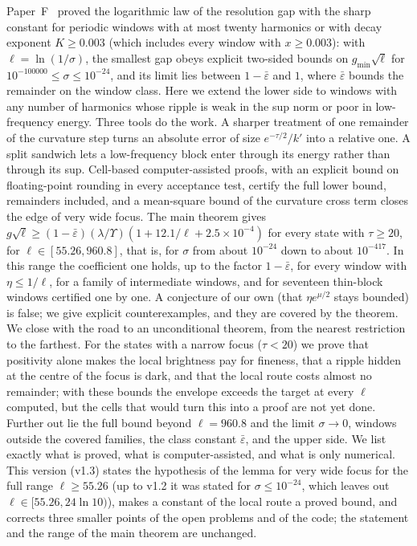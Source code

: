 Paper~F~\cite{F} proved the logarithmic law of the resolution gap with the sharp constant for periodic windows with at most twenty harmonics or with decay exponent $K\ge0.003$ (which includes every window with $x\ge0.003$):
with $\ell=\ln(1/\sigma)$, the smallest gap obeys explicit two-sided bounds on $g_{\min}\sqrt{\ell}$ for $10^{-100000}\le\sigma\le10^{-24}$, and its limit lies between $1-\bar\varepsilon$ and $1$, where $\bar\varepsilon$ bounds the remainder on the window class.
Here we extend the lower side to windows with any number of harmonics whose ripple is weak in the sup norm or poor in low-frequency energy.
Three tools do the work.
A sharper treatment of one remainder of the curvature step turns an absolute error of size $e^{-\tau/2}/k'$ into a relative one.
A split sandwich lets a low-frequency block enter through its energy rather than through its sup.
Cell-based computer-assisted proofs, with an explicit bound on floating-point rounding in every acceptance test, certify the full lower bound, remainders included, and a mean-square bound of the curvature cross term closes the edge of very wide focus.
The main theorem gives $g\sqrt{\ell}\ge(1-\bar\varepsilon)(\lambda/\Upsilon)(1+12.1/\ell+2.5\times10^{-4})$ for every state with $\tau\ge20$, for $\ell\in[55.26,960.8]$, that is, for $\sigma$ from about $10^{-24}$ down to about $10^{-417}$.
In this range the coefficient one holds, up to the factor $1-\bar\varepsilon$, for every window with $\eta\le1/\ell$, for a family of intermediate windows, and for seventeen thin-block windows certified one by one.
A conjecture of our own (that $\eta e^{\mu/2}$ stays bounded) is false; we give explicit counterexamples, and they are covered by the theorem.
We close with the road to an unconditional theorem, from the nearest restriction to the farthest.
For the states with a narrow focus ($\tau<20$) we prove that positivity alone makes the local brightness pay for fineness, that a ripple hidden at the centre of the focus is dark, and that the local route costs almost no remainder; with these bounds the envelope exceeds the target at every $\ell$ computed, but the cells that would turn this into a proof are not yet done.
Further out lie the full bound beyond $\ell=960.8$ and the limit $\sigma\to0$, windows outside the covered families, the class constant $\bar\varepsilon$, and the upper side.
We list exactly what is proved, what is computer-assisted, and what is only numerical.
This version (v1.3) states the hypothesis of the lemma for very wide focus for the full range $\ell\ge55.26$ (up to v1.2 it was stated for $\sigma\le10^{-24}$, which leaves out $\ell\in[55.26,24\ln10)$), makes a constant of the local route a proved bound, and corrects three smaller points of the open problems and of the code; the statement and the range of the main theorem are unchanged.
